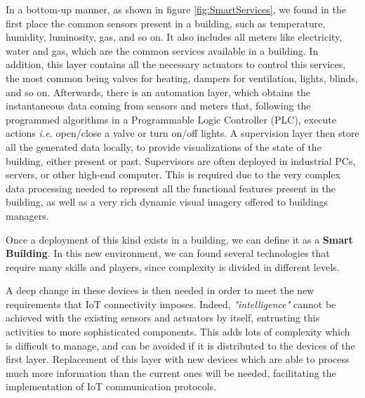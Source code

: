 
In a bottom-up manner, as shown in figure \ref{fig:SmartServices}, we found in the first place the common sensors present in a building, such as temperature, humidity, luminosity, gas, and so on. 
It also includes all meters like electricity, water and gas, which are the common services available in a building.
In addition, this layer contains all the necessary actuators to control this services, the most common being valves for heating, dampers for ventilation, lights, blinds, and so on.
Afterwards, there is an automation layer, which obtains the instantaneous data coming from sensors and meters that, following the programmed algorithms in a Programmable Logic Controller (PLC), execute actions \textit{i.e.} open/close a valve or turn on/off lights.
A supervision layer then store all the generated data locally, to provide visualizations of the state of the building, either present or past.
Supervisors are often deployed in industrial PCs, servers, or other high-end computer.
This is required due to the very complex data processing needed to represent all the functional features present in the building, as well as a very rich dynamic visual imagery offered to buildings managers.

Once a deployment of this kind exists in a building, we can define it as a \textbf{Smart Building}.
In this new environment, we can found several technologies that require many skills and players, since complexity is divided in different levels.

A deep change in these devices is then needed in order to meet the new requirements that IoT connectivity imposes.
Indeed, \textit{"intelligence"} cannot be achieved with the existing sensors and actuators by itself, entrusting this activities to more sophisticated components.
This adds lots of complexity which is difficult to manage, and can be avoided if it is distributed to the devices of the first layer.
Replacement of this layer with new devices which are able to process much more information than the current ones will be needed, facilitating the implementation of IoT communication protocols.

